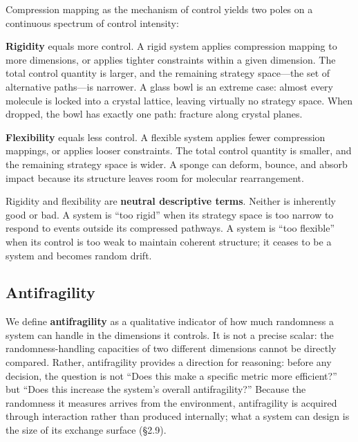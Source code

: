 \documentclass[11pt,a4paper]{article}
\begin{document}
Compression mapping as the mechanism of control yields two poles on a continuous spectrum of control intensity:

\textbf{Rigidity} equals more control. A rigid system applies compression mapping to more dimensions, or applies tighter constraints within a given dimension. The total control quantity is larger, and the remaining strategy space---the set of alternative paths---is narrower. A glass bowl is an extreme case: almost every molecule is locked into a crystal lattice, leaving virtually no strategy space. When dropped, the bowl has exactly one path: fracture along crystal planes.

\textbf{Flexibility} equals less control. A flexible system applies fewer compression mappings, or applies looser constraints. The total control quantity is smaller, and the remaining strategy space is wider. A sponge can deform, bounce, and absorb impact because its structure leaves room for molecular rearrangement.

Rigidity and flexibility are \textbf{neutral descriptive terms}. Neither is inherently good or bad. A system is ``too rigid'' when its strategy space is too narrow to respond to events outside its compressed pathways. A system is ``too flexible'' when its control is too weak to maintain coherent structure; it ceases to be a system and becomes random drift.

\subsection{Antifragility}

We define \textbf{antifragility} as a qualitative indicator of how much randomness a system can handle in the dimensions it controls. It is not a precise scalar: the randomness-handling capacities of two different dimensions cannot be directly compared. Rather, antifragility provides a direction for reasoning: before any decision, the question is not ``Does this make a specific metric more efficient?'' but ``Does this increase the system's overall antifragility?'' Because the randomness it measures arrives from the environment, antifragility is acquired through interaction rather than produced internally; what a system can design is the size of its exchange surface (\S2.9).
\end{document}

